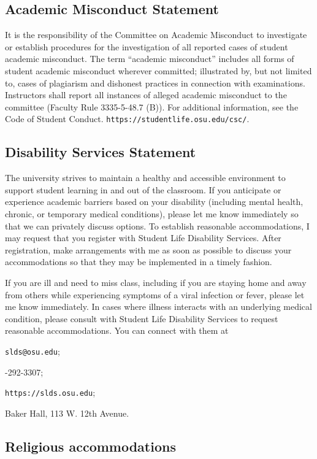 \documentclass[12pt]{amsart}
\begin{document}
\subsection*{Academic Misconduct Statement}
It is the responsibility of the Committee on Academic Misconduct to investigate
or establish procedures for the investigation of all reported cases of student
academic misconduct. The term ``academic misconduct'' includes all forms of
student academic misconduct wherever committed; illustrated by, but not limited
to, cases of plagiarism and dishonest practices in connection with
examinations. Instructors shall report all instances of alleged academic
misconduct to the committee (Faculty Rule 3335-5-48.7 (B)). For additional
information, see the Code of Student Conduct.
\noindent\texttt{https://studentlife.osu.edu/csc/}.

\Huge
\subsection*{Disability Services Statement}
The university strives to maintain a healthy and accessible environment to
support student learning in and out of the classroom.  If you anticipate or
experience academic barriers based on your disability (including mental health,
chronic, or temporary medical conditions), please let me know immediately so
that we can privately discuss options.	To establish reasonable accommodations,
I may request that you register with Student Life Disability Services.	After
registration, make arrangements with me as soon as possible to discuss your
accommodations so that they may be implemented in a timely fashion.

If you are ill and need to miss class, including if you are staying home and
away from others while experiencing symptoms of a viral infection or fever,
please let me know immediately. In cases where illness interacts with an
underlying medical condition, please consult with Student Life Disability
Services to request reasonable accommodations. You can connect with them at

\noindent
\texttt{slds@osu.edu};

-292-3307;

\noindent
\texttt{https://slds.osu.edu};

 Baker Hall, 113
W. 12th Avenue.  \normalsize

\normalsize
\subsection*{Religious accommodations}
\end{document}
